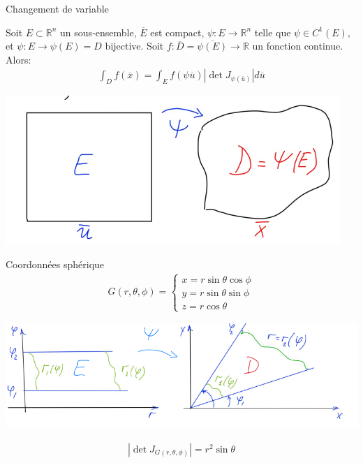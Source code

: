 \begin{parag}{Changement de variable}
    
    \begin{theoreme}
    Soit $E \subset \mathbb{R}^{n} $ un sous-ensemble, $\overline{E}$ est compact, $\psi: E \to \mathbb{R}^{n}$ telle que $\psi \in C^1\left(E\right)$, et $\psi: E \to \psi\left(E\right) = D$ bijective. Soit $f : \overline{D}  = \overline{\psi\left(E\right)} \to \mathbb{R}$ un fonction continue. Alors:
    \begin{align*} \int_D f\left(\overline{x}\right) =  \int_E f\left(\psi\overline{u}\right)\left|\det J_{\psi\left(\overline{u}\right)}\right|d\overline{u} \end{align*}
    \end{theoreme}
        \begin{center}
            \includegraphics[scale=0.8]{32025-05-26.png}
        \end{center}
\end{parag}
\begin{parag}{Coordonnées sphérique}
    \begin{align*} 
        G\left(r, \theta, \phi\right) =  
        \begin{cases}
            x =  r \sin \theta \cos \phi\\
            y = r \sin \theta \sin \phi\\
            z =  r \cos \theta
        \end{cases}
    \end{align*}
    \begin{center}
        \includegraphics[scale=0.6]{42025-05-26.png}
    \end{center}
    \begin{align*} \left|\det J_{G\left(r, \theta, \phi\right)}\right| = r^2\sin\theta \end{align*}
\end{parag}
